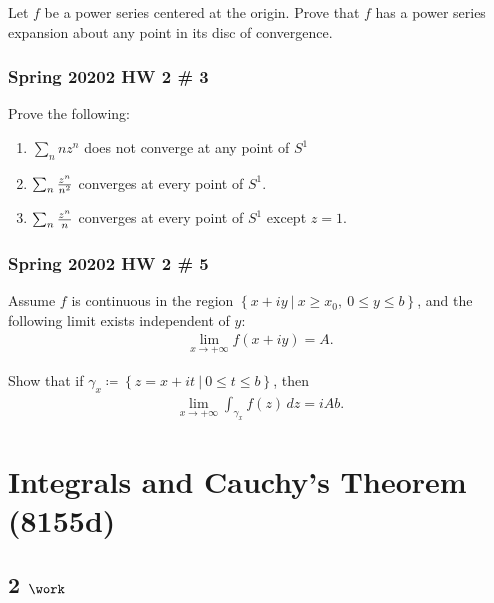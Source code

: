 Let \(f\) be a power series centered at the origin. Prove that \(f\) has
a power series expansion about any point in its disc of convergence.

\hypertarget{spring-20202-hw-2-3}{%
\subsubsection{Spring 20202 HW 2 \# 3}\label{spring-20202-hw-2-3}}

Prove the following:

\begin{enumerate}
\def\labelenumi{\alph{enumi}.}
\item
  \(\sum_{n} nz^n\) does not converge at any point of \(S^1\)
\item
  \(\sum_n {z^n \over n^2}\) converges at every point of \(S^1\).
\item
  \(\sum_n {z^n \over n}\) converges at every point of \(S^1\) except
  \(z=1\).
\end{enumerate}

\hypertarget{spring-20202-hw-2-5}{%
\subsubsection{Spring 20202 HW 2 \# 5}\label{spring-20202-hw-2-5}}

Assume \(f\) is continuous in the region
\(\left\{{x+iy {~\mathrel{\Big|}~}x\geq x_0, ~ 0\leq y \leq b}\right\}\),
and the following limit exists independent of \(y\):
\begin{align*}
\lim_{x\to +\infty}f(x+iy) = A
.\end{align*}

Show that if
\(\gamma_x \coloneqq\left\{{z = x+it {~\mathrel{\Big|}~}0 \leq t \leq b}\right\}\),
then
\begin{align*}
\lim_{x\to +\infty} \int_{\gamma_x} f(z) \,dz = iAb
.\end{align*}

\hypertarget{integrals-and-cauchys-theorem-8155d}{%
\section{Integrals and Cauchy's Theorem
(8155d)}\label{integrals-and-cauchys-theorem-8155d}}

\hypertarget{work-17}{%
\subsection{\texorpdfstring{2
\(\work\)}{2 \textbackslash work}}\label{work-17}}

